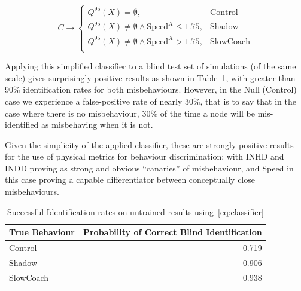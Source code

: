 \documentclass[conference,compsoc,letterpaper]{IEEEtran}
\begin{document}
\begin{equation}
  C \rightarrow 
  \begin{cases}
    Q^{95}(X) = \emptyset,& \text{Control}\\
    Q^{95}(X) \neq \emptyset \land \text{Speed}^X \leq 1.75, & \text{Shadow}\\
    Q^{95}(X) \neq \emptyset \land \text{Speed}^X > 1.75,& \text{SlowCoach}\\
  \end{cases}
  \label{eq:classifier}
\end{equation}

Applying this simplified classifier to a blind test set of simulations (of the same scale) gives surprisingly positive results as shown in Table~\ref{tab:classifier}, with greater than 90\% identification rates for both misbehaviours.
However, in the Null (Control) case we experience a false-positive rate of nearly 30\%, that is to say that in the case where there is no misbehaviour, 30\% of the time a node will be mis-identified as misbehaving when it is not.

Given the simplicity of the applied classifier, these are strongly positive results for the use of physical metrics for behaviour discrimination; with INHD and INDD proving as strong and obvious ``canaries'' of misbehaviour, and Speed in this case proving a capable differentiator between conceptually close misbehaviours.

\begin{table}[h]
  \caption{Successful Identification rates on untrained results using~\eqref{eq:classifier}}
  \centering
  \begin{tabular}{lr}
    \toprule
    True Behaviour &  Probability of Correct Blind Identification \\
    \midrule
    Control        &                                        0.719 \\
    Shadow         &                                        0.906 \\
    SlowCoach      &                                        0.938 \\
    \bottomrule
  \end{tabular}
  \label{tab:classifier}
\end{table}

%  
\end{document}
